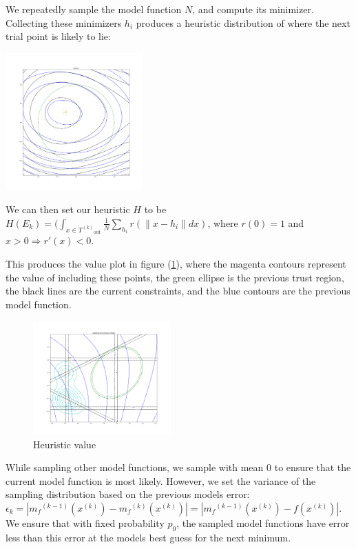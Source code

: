 \documentclass{article}
\theoremstyle{case}
\newcommand{\modelk}{{{m}_f}^{(k)}}
\newcommand{\modelkmone}{{{m}_f}^{(k-1)}}
\newcommand{\iteratek}{{x}^{(k)}}
\newcommand{\outertrk}{{T^{(k)}}_{\text{out}}}
\let\oldref\ref
\renewcommand{\ref}[1]{(\oldref{#1})}
\begin{document}
We repeatedly sample the model function $N$, and compute its minimizer.
Collecting these minimizers $h_i$ produces a heuristic distribution of where the next trial point is likely to lie:

\begin{center}
\includegraphics[width=200px]{images/sampled_minimums.png}
\end{center}

We can then set our heuristic $H$ to be $H(E_k) = (\int_{x\in \outertrk} \frac 1 N \sum_{h_i}r(\|x - h_i\| dx)$,
where $r(0) = 1$ and $x>0 \Rightarrow r'(x) < 0$.

This produces the value plot in figure \ref{hvalueplot}, where the magenta contours represent the value of including these points, the green ellipse is the previous trust region, the black lines are the current constraints, and the blue contours are the previous model function.

\begin{figure}[h]
    \centering
    \includegraphics[width=200px]{images/heuristic_value.png}
    \caption{Heuristic value}
    \label{hvalueplot}
\end{figure}



While sampling other model functions, we sample with mean $0$ to ensure that the current model function is most likely.
However, we set the variance of the sampling distribution based on the previous models error:
$\epsilon_k = |\modelkmone(\iteratek) - \modelk(\iteratek)| = |\modelkmone(\iteratek) - f(\iteratek)|$.
We ensure that with fixed probability $p_0$, the sampled model functions have error less than this error at the models best guess for the next minimum.
\end{document}
